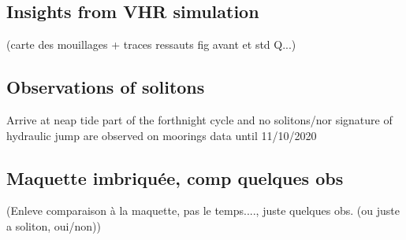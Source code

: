\subsection{Insights from VHR simulation}
(carte des mouillages + traces ressauts fig avant et std Q...)


\subsection{Observations of solitons}
Arrive at neap tide part of the forthnight cycle and no solitons/nor signature of hydraulic jump are observed on moorings data until 11/10/2020 



\subsection{Maquette imbriquée, comp quelques obs}

(Enleve comparaison à la maquette, pas le temps...., juste quelques obs. (ou juste a soliton, oui/non))
